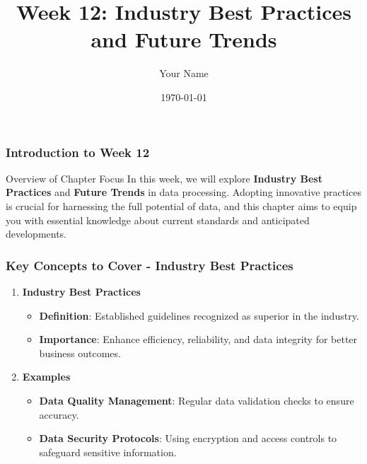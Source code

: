 \documentclass{beamer}
\title{Week 12: Industry Best Practices and Future Trends}
\author{Your Name}
\institute{Your Institution}
\date{\today}
\begin{document}
\frame{\titlepage}

\begin{frame}[fragile]
    \frametitle{Introduction to Week 12}
    \begin{block}{Overview of Chapter Focus}
        In this week, we will explore \textbf{Industry Best Practices} and \textbf{Future Trends} in data processing. Adopting innovative practices is crucial for harnessing the full potential of data, and this chapter aims to equip you with essential knowledge about current standards and anticipated developments.
    \end{block}
\end{frame}

\begin{frame}[fragile]
    \frametitle{Key Concepts to Cover - Industry Best Practices}
    \begin{enumerate}
        \item \textbf{Industry Best Practices}
        \begin{itemize}
            \item \textbf{Definition}: Established guidelines recognized as superior in the industry.
            \item \textbf{Importance}: Enhance efficiency, reliability, and data integrity for better business outcomes.
        \end{itemize}
        \item \textbf{Examples}
        \begin{itemize}
            \item \textbf{Data Quality Management}: Regular data validation checks to ensure accuracy.
            \item \textbf{Data Security Protocols}: Using encryption and access controls to safeguard sensitive information.
        \end{itemize}
    \end{enumerate}
\end{frame}
\end{document}
